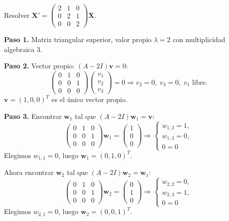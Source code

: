 \begin{example}
Resolver $\mathbf{X}'=
\begin{pmatrix}
2&1&0\\
0&2&1\\
0&0&2
\end{pmatrix}\mathbf{X}$.
\begin{myproof}
\textbf{Paso 1.} Matriz triangular superior, valor propio $\lambda=2$ con multiplicidad algebraica 3.

\textbf{Paso 2.} Vector propio:
$(A-2I)\mathbf{v}=0$:
\[
\begin{pmatrix}
0&1&0\\
0&0&1\\
0&0&0
\end{pmatrix}
\begin{pmatrix}
v_1\\v_2\\v_3
\end{pmatrix}=0
\Rightarrow v_2=0,\; v_3=0,\; v_1\text{ libre}.
\]
$\mathbf{v}=(1,0,0)^T$ es el único vector propio.

\textbf{Paso 3.} Encontrar $\mathbf{w}_1$ tal que $(A-2I)\mathbf{w}_1=\mathbf{v}$:
\[
\begin{pmatrix}
0&1&0\\
0&0&1\\
0&0&0
\end{pmatrix}
\mathbf{w}_1=
\begin{pmatrix}
1\\0\\0
\end{pmatrix}
\Rightarrow
\begin{cases}
w_{1,2}=1,\\
w_{1,3}=0,\\
0=0
\end{cases}
\]
Elegimos $w_{1,1}=0$, luego $\mathbf{w}_1=(0,1,0)^T$.

Ahora encontrar $\mathbf{w}_2$ tal que $(A-2I)\mathbf{w}_2=\mathbf{w}_1$:
\[
\begin{pmatrix}
0&1&0\\
0&0&1\\
0&0&0
\end{pmatrix}
\mathbf{w}_2=
\begin{pmatrix}
0\\1\\0
\end{pmatrix}
\Rightarrow
\begin{cases}
w_{2,2}=0,\\
w_{2,3}=1,\\
0=0
\end{cases}
\]
Elegimos $w_{2,1}=0$, luego $\mathbf{w}_2=(0,0,1)^T$.


\end{myproof}
\end{example}
